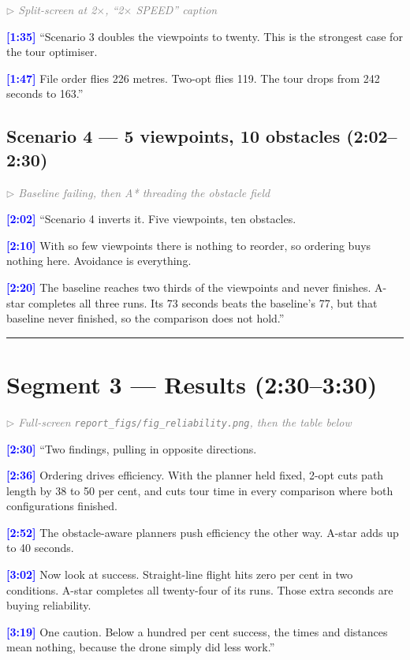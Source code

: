 \documentclass[11pt,a4paper]{article}
\newcommand{\timecode}[1]{\textbf{\textcolor{blue}{[#1]}}}
\newcommand{\cue}[1]{\textit{\textcolor{gray}{$\triangleright$ #1}}}
\begin{document}
\cue{Split-screen at 2$\times$, ``2$\times$ SPEED'' caption}

\timecode{1:35}
``Scenario 3 doubles the viewpoints to twenty. This is the strongest case for the tour optimiser.

\timecode{1:47}
File order flies 226 metres. Two-opt flies 119. The tour drops from 242 seconds to 163.''

\subsection*{Scenario 4 --- 5 viewpoints, 10 obstacles (2:02--2:30)}

\cue{Baseline failing, then A* threading the obstacle field}

\timecode{2:02}
``Scenario 4 inverts it. Five viewpoints, ten obstacles.

\timecode{2:10}
With so few viewpoints there is nothing to reorder, so ordering buys nothing here. Avoidance is everything.

\timecode{2:20}
The baseline reaches two thirds of the viewpoints and never finishes. A-star completes all three runs. Its 73 seconds beats the baseline's 77, but that baseline never finished, so the comparison does not hold.''

\bigskip\hrule\bigskip

\section*{Segment 3 --- Results (2:30--3:30)}

\cue{Full-screen \texttt{report\_figs/fig\_reliability.png}, then the table below}

\timecode{2:30}
``Two findings, pulling in opposite directions.

\timecode{2:36}
Ordering drives efficiency. With the planner held fixed, 2-opt cuts path length by 38 to 50 per cent, and cuts tour time in every comparison where both configurations finished.

\timecode{2:52}
The obstacle-aware planners push efficiency the other way. A-star adds up to 40 seconds.

\timecode{3:02}
Now look at success. Straight-line flight hits zero per cent in two conditions. A-star completes all twenty-four of its runs. Those extra seconds are buying reliability.

\timecode{3:19}
One caution. Below a hundred per cent success, the times and distances mean nothing, because the drone simply did less work.''
\end{document}
